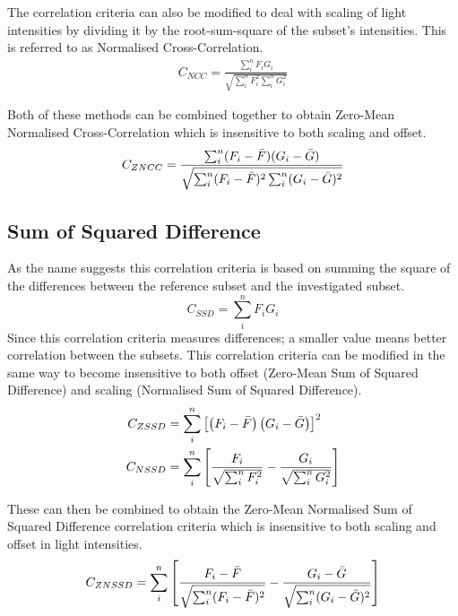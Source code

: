 \documentclass[[12pt,oneside,openany,a4paper, %
\newcommand*\mean[1]{\bar{#1}} %
\begin{document}
The correlation criteria can also be modified to deal with scaling of light intensities by dividing it by the root-sum-square of the subset's intensities. This is referred to as Normalised Cross-Correlation. 
\begin{align}
  C_{NCC} = \frac{\sum_i^n F_i G_i}{\sqrt{\sum_i^n F_i^2 \sum_i^n G_i^2}}
\end{align}

Both of these methods can be combined together to obtain Zero-Mean Normalised Cross-Correlation which is insensitive to both scaling and offset.
\begin{equation}
  C_{ZNCC} = \frac{\sum_i^n (F_i - \mean{F}) (G_i - \mean{G} )}{\sqrt{\sum_i^n (F_i - \mean{F})^2 \sum_i^n (G_i - \mean{G})^2}}
\end{equation}

\subsection{Sum of Squared Difference}
As the name suggests this correlation criteria is based on summing the square of the differences between the reference subset and the investigated subset.
\begin{equation}
  C_{SSD} = \sum_i^n F_i G_i
\end{equation}
Since this correlation criteria measures differences; a smaller value means better correlation between the subsets. This correlation criteria can be modified in the same way to become insensitive to both offset (Zero-Mean Sum of Squared Difference) and scaling (Normalised Sum of Squared Difference).
\begin{align}
  C_{ZSSD} &= \sum_i^n \left[ \left( F_i - \mean{F} \right) \left( G_i - \mean{G} \right) \right]^2 \\
  C_{NSSD} &= \sum_i^n \left[ \frac{F_i}{\sqrt{\sum_i^n F_i^2}} - \frac{G_i}{\sqrt{\sum_i^n G_i^2}} \right]
\end{align}

These can then be combined to obtain the Zero-Mean Normalised Sum of Squared Difference correlation criteria which is insensitive to both scaling and offset in light intensities.
\begin{equation}
  C_{ZNSSD} = \sum_i^n \left[ \frac{F_i - \mean{F}}{\sqrt{\sum_i^n (F_i - \mean{F})^2}} - \frac{G_i - \mean{G}}{\sqrt{\sum_i^n (G_i - \mean{G})^2}} \right]
\end{equation}
\end{document}
